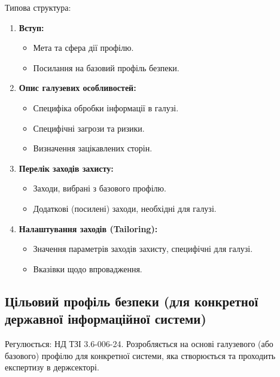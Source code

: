 \documentclass{article}
\begin{document}
Типова структура:
\begin{enumerate}
    \item \textbf{Вступ:}
    \begin{itemize}
        \item Мета та сфера дії профілю.
        \item Посилання на базовий профіль безпеки.
    \end{itemize}
    \item \textbf{Опис галузевих особливостей:}
    \begin{itemize}
        \item Специфіка обробки інформації в галузі.
        \item Специфічні загрози та ризики.
        \item Визначення зацікавлених сторін.
    \end{itemize}
    \item \textbf{Перелік заходів захисту:}
    \begin{itemize}
        \item Заходи, вибрані з базового профілю.
        \item Додаткові (посилені) заходи, необхідні для галузі.
    \end{itemize}
    \item \textbf{Налаштування заходів (Tailoring):}
    \begin{itemize}
        \item Значення параметрів заходів захисту, специфічні для галузі.
        \item Вказівки щодо впровадження.
    \end{itemize}
\end{enumerate}

\subsection{Цільовий профіль безпеки (для конкретної державної інформаційної системи)}

Регулюється: НД ТЗІ 3.6-006-24.
Розробляється на основі галузевого (або базового) профілю для конкретної системи, яка створюється та проходить експертизу в держсекторі.
\end{document}

